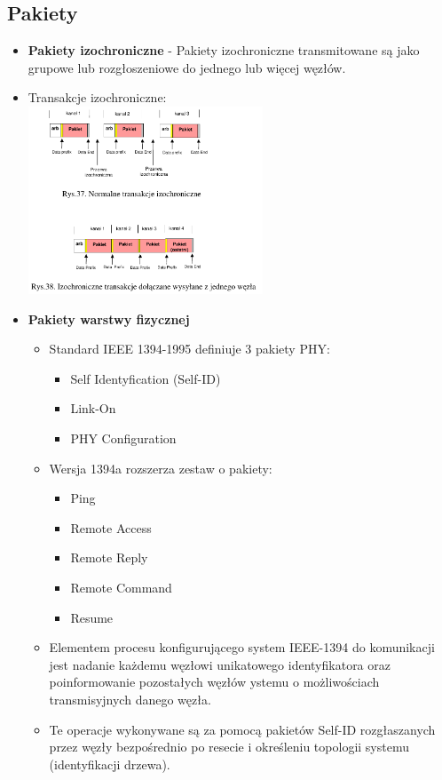 \subsection{Pakiety}
\begin{itemize}
	\item \textbf{Pakiety izochroniczne} - Pakiety izochroniczne transmitowane są jako grupowe lub rozgłoszeniowe do jednego lub więcej węzłów.
	\item Transakcje izochroniczne:\\
	\includegraphics[width=7cm]{./wyklady/FIREWIRE_48_1.pdf}
	\item \textbf{Pakiety warstwy fizycznej}
	\begin{itemize}
		\item Standard IEEE 1394-1995 definiuje 3 pakiety PHY:
		\begin{itemize}
			\item Self Identyfication (Self-ID)
			\item Link-On
			\item PHY Configuration
		\end{itemize}
		\item Wersja 1394a rozszerza zestaw o pakiety:
		\begin{itemize}
			\item Ping
			\item Remote Access
			\item Remote Reply
			\item Remote Command
			\item Resume
		\end{itemize}
		\item Elementem procesu konfigurującego system IEEE-1394 do komunikacji jest nadanie każdemu węzłowi unikatowego identyfikatora oraz poinformowanie pozostałych węzłów ystemu o możliwościach transmisyjnych danego węzła.
		\item Te operacje wykonywane są za pomocą pakietów Self-ID rozgłaszanych przez węzły bezpośrednio po resecie i określeniu topologii systemu (identyfikacji drzewa).
	\end{itemize}
\end{itemize}

